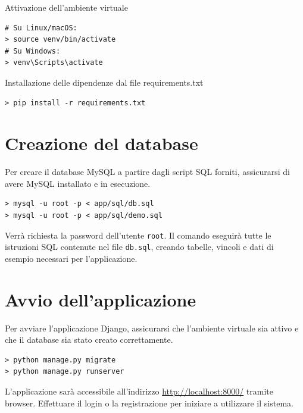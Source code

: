 \documentclass[a4paper,12pt]{report}
\begin{document}
\noindent Attivazione dell'ambiente virtuale
\begin{verbatim}
# Su Linux/macOS:
> source venv/bin/activate
# Su Windows:
> venv\Scripts\activate
\end{verbatim}

\noindent Installazione delle dipendenze dal file requirements.txt
\begin{verbatim}
> pip install -r requirements.txt
\end{verbatim}

\section{Creazione del database}
Per creare il database MySQL a partire dagli script SQL forniti,
assicurarsi di avere MySQL
installato e in esecuzione.

\begin{verbatim}
> mysql -u root -p < app/sql/db.sql
> mysql -u root -p < app/sql/demo.sql
\end{verbatim}

Verrà richiesta la password dell'utente \texttt{root}. Il comando
eseguirà tutte le
istruzioni SQL contenute nel file \texttt{db.sql}, creando tabelle,
vincoli e dati di
esempio necessari per l'applicazione.

\section{Avvio dell'applicazione}

Per avviare l'applicazione Django, assicurarsi che l'ambiente
virtuale sia attivo e che il database
sia stato creato correttamente.

\begin{verbatim}
> python manage.py migrate
> python manage.py runserver
\end{verbatim}

L'applicazione sarà accessibile all'indirizzo
\url{http://localhost:8000/} tramite browser. Effettuare
il login o la registrazione per iniziare a utilizzare il sistema.
\end{document}
